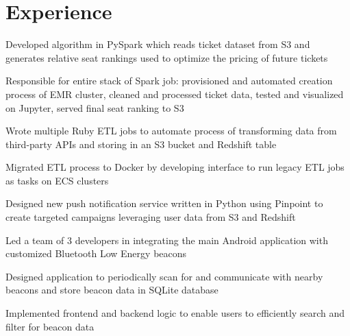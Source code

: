 \documentclass[letterpaper]{deedy-resume}
\begin{document}
\hfill
%
%
\begin{minipage}[t]{0.66\textwidth}

\section{Experience}


\vspace{\topsep}
\begin{tightitemize}
\item Developed algorithm in PySpark which reads ticket dataset from S3 and generates relative seat rankings used to optimize the pricing of future tickets
\item Responsible for entire stack of Spark job: provisioned and automated creation process of EMR cluster, cleaned and processed ticket data, tested and visualized on Jupyter, served final seat ranking to S3
\item Wrote multiple Ruby ETL jobs to automate process of transforming data from third-party APIs and storing in an S3 bucket and Redshift table
\item Migrated ETL process to Docker by developing interface to run legacy ETL jobs as tasks on ECS clusters
\item Designed new push notification service written in Python using Pinpoint to create targeted campaigns leveraging user data from S3 and Redshift
\end{tightitemize}

\sectionspace


\begin{tightitemize}
\item Led a team of 3 developers in integrating the main Android application with customized Bluetooth Low Energy beacons
\item Designed application to periodically scan for and communicate with nearby beacons and store beacon data in SQLite database
\item Implemented frontend and backend logic to enable users to efficiently search and filter for beacon data
\end{tightitemize}


\end{minipage}
\end{document}
